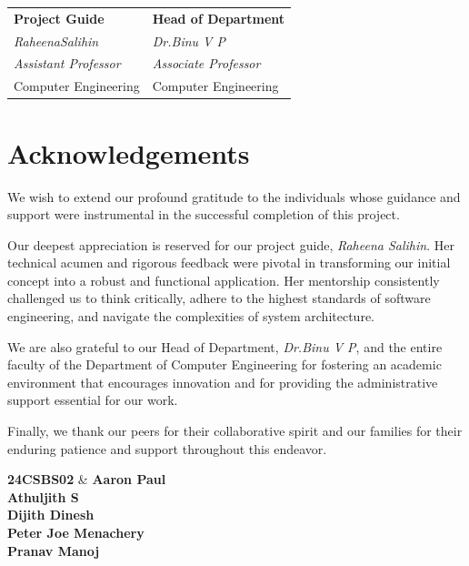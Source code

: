 \documentclass[12pt, a4paper]{report}
\begin{document}
\begin{tabular}{p{} p{}}
    \textbf{Project Guide} & \hfill \textbf{Head of Department} \\
    \textit{RaheenaSalihin} & \hfill \textit{Dr.Binu V P} \\
    \textit{Assistant Professor} & \hfill \textit{Associate Professor} \\
    Computer Engineering & \hfill Computer Engineering \\
\end{tabular}

\chapter*{Acknowledgements}
\thispagestyle{empty}

We wish to extend our profound gratitude to the individuals whose guidance and support were instrumental in the successful completion of this project.

Our deepest appreciation is reserved for our project guide, \textit{Raheena Salihin}. Her technical acumen and rigorous feedback were pivotal in transforming our initial concept into a robust and functional application. Her mentorship consistently challenged us to think critically, adhere to the highest standards of software engineering, and navigate the complexities of system architecture.

We are also grateful to our Head of Department, \textit{Dr.Binu V P}, and the entire faculty of the Department of Computer Engineering for fostering an academic environment that encourages innovation and for providing the administrative support essential for our work.

Finally, we thank our peers for their collaborative spirit and our families for their enduring patience and support throughout this endeavor.

\vspace{3cm}
\begin{flushright}
    \textbf{24CSBS02} & \textbf{Aaron Paul} \\
    \textbf{Athuljith S} \\
    \textbf{Dijith Dinesh} \\
    \textbf{Peter Joe Menachery} \\
    \textbf{Pranav Manoj}
\end{flushright}
\end{document}
